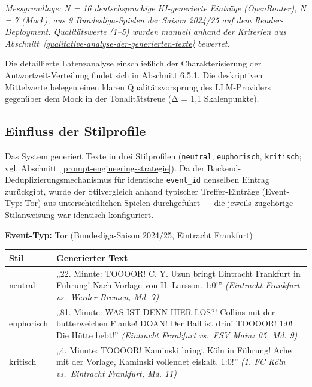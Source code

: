 \emph{Messgrundlage: N = 16 deutschsprachige KI-generierte Einträge
(OpenRouter), N = 7 (Mock), aus 9 Bundesliga-Spielen der Saison
2024/25 auf dem Render-Deployment. Qualitätswerte (1--5) wurden
manuell anhand der Kriterien aus Abschnitt~\ref{qualitative-analyse-der-generierten-texte} bewertet.}

Die detaillierte Latenzanalyse einschließlich der Charakterisierung der
Antwortzeit-Verteilung findet sich in Abschnitt 6.5.1. Die deskriptiven
Mittelwerte belegen einen klaren Qualitätsvorsprung des LLM-Providers
gegenüber dem Mock in der Tonalitätstreue (Δ = 1,1 Skalenpunkte).

\subsection{Einfluss der
Stilprofile}\label{einfluss-der-stilprofile}

Das System generiert Texte in drei Stilprofilen (\texttt{neutral}, \texttt{euphorisch}, \texttt{kritisch}; vgl. Abschnitt~\ref{prompt-engineering-strategie}). Da der Backend-Deduplizierungsmechanismus für identische
\texttt{event\_id} denselben Eintrag zurückgibt, wurde der Stilvergleich
anhand typischer Treffer-Einträge (Event-Typ: Tor) aus unterschiedlichen
Spielen durchgeführt --- die jeweils zugehörige Stilanweisung war
identisch konfiguriert.

\textbf{Event-Typ:} Tor (Bundesliga-Saison 2024/25, Eintracht Frankfurt)

{\def\LTcaptype{none} %
\begin{longtable}[]{@{}
  >{\raggedright\arraybackslash}p{}
  >{\raggedright\arraybackslash}p{}@{}}
\toprule\noalign{}
\begin{minipage}[b]{\linewidth}\raggedright
Stil
\end{minipage} & \begin{minipage}[b]{\linewidth}\raggedright
Generierter Text
\end{minipage} \\
\midrule\noalign{}
\endhead
\bottomrule\noalign{}
\endlastfoot
neutral & „22. Minute: TOOOOR! C. Y. Uzun bringt Eintracht Frankfurt in
Führung! Nach Vorlage von H. Larsson. 1:0!'' \emph{(Eintracht Frankfurt
vs.~Werder Bremen, Md. 7)} \\
euphorisch & „81. Minute: WAS IST DENN HIER LOS?! Collins mit der
butterweichen Flanke! DOAN! Der Ball ist drin! TOOOOR! 1:0! Die Hütte
bebt!'' \emph{(Eintracht Frankfurt vs.~FSV Mainz 05, Md. 9)} \\
kritisch & „4. Minute: TOOOOR! Kaminski bringt Köln in Führung! Ache mit
der Vorlage, Kaminski vollendet eiskalt. 1:0!'' \emph{(1. FC Köln
vs.~Eintracht Frankfurt, Md. 11)} \\
\end{longtable}
}

